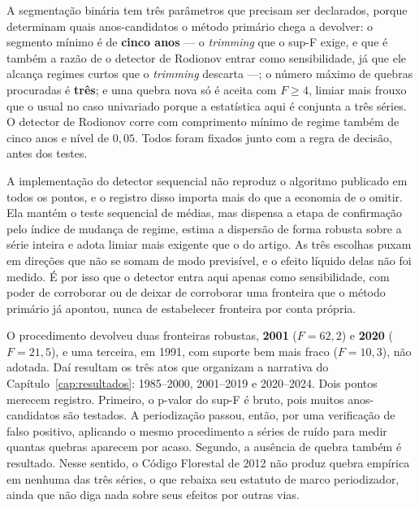 A segmentação binária tem três parâmetros que precisam ser declarados, porque
determinam quais anos-candidatos o método primário chega a devolver: o segmento
mínimo é de \textbf{cinco anos} --- o \emph{trimming} que o sup-F exige, e que
é também a razão de o detector de Rodionov entrar como sensibilidade, já que
ele alcança regimes curtos que o \emph{trimming} descarta ---; o número máximo
de quebras procuradas é \textbf{três}; e uma quebra nova só é aceita com
\(F \geq 4\), limiar mais frouxo que o usual no caso univariado porque a
estatística aqui é conjunta a três séries. O detector de Rodionov corre com
comprimento mínimo de regime também de cinco anos e nível de \(0{,}05\). Todos
foram fixados junto com a regra de decisão, antes dos testes.

A implementação do detector sequencial não reproduz o algoritmo publicado em
todos os pontos, e o registro disso importa mais do que a economia de o omitir.
Ela mantém o teste sequencial de médias, mas dispensa a etapa de confirmação
pelo índice de mudança de regime, estima a dispersão de forma robusta sobre a
série inteira e adota limiar mais exigente que o do artigo. As três escolhas
puxam em direções que não se somam de modo previsível, e o efeito líquido delas
não foi medido. É por isso que o detector entra aqui apenas como sensibilidade,
com poder de corroborar ou de deixar de corroborar uma fronteira que o método
primário já apontou, nunca de estabelecer fronteira por conta própria.

O procedimento devolveu duas fronteiras robustas, \textbf{2001} ($F = 62{,}2$)
e \textbf{2020} ($F = 21{,}5$), e uma terceira, em 1991, com suporte bem mais
fraco ($F = 10{,}3$), não adotada. Daí resultam os três atos que organizam a
narrativa do Capítulo~\ref{cap:resultados}: 1985--2000, 2001--2019 e
2020--2024. Dois pontos merecem registro. Primeiro, o p-valor do sup-F é
bruto, pois muitos anos-candidatos são testados. A periodização passou, então, por
uma verificação de falso positivo, aplicando o mesmo procedimento a séries de
ruído para medir quantas quebras aparecem por acaso. Segundo, a ausência de
quebra também é resultado. Nesse sentido, o Código Florestal de 2012 não
produz quebra empírica em nenhuma das três séries, o que rebaixa seu estatuto
de marco periodizador, ainda que não diga nada sobre seus efeitos por outras
vias.

